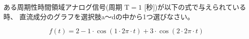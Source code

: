 ある周期性時間領域アナログ信号(周期 $\textrm{T} = 1$ [秒])が以下の式で与えられている時、
直流成分のグラフを選択肢a〜dの中から1つ選びなさい。

\[
f(t) = 
2
- 1 \cdot \cos( 1 \cdot 2 \pi \cdot t )
+ 3 \cdot \cos( 2 \cdot 2 \pi \cdot t )
\]
